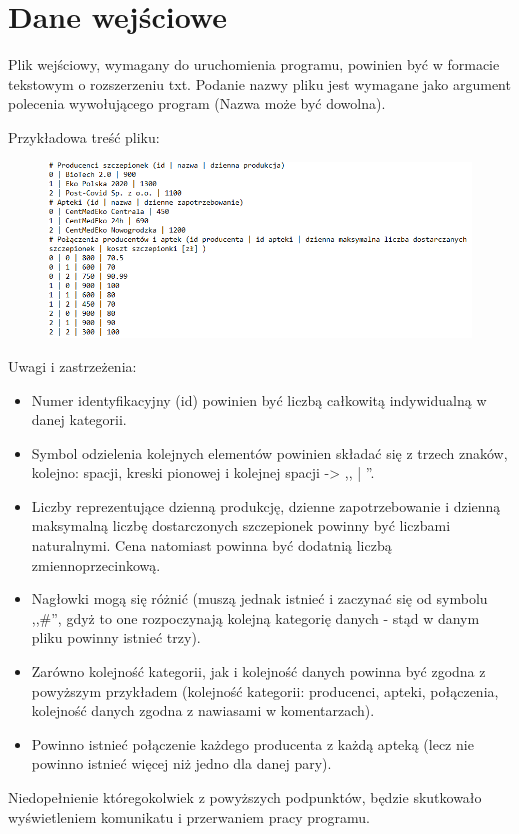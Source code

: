 \documentclass{article}
\begin{document}
\section{Dane wejściowe}
{\fontsize{12}{12}\selectfont
    Plik wejściowy, wymagany do uruchomienia programu, powinien być w formacie tekstowym o rozszerzeniu txt. Podanie nazwy pliku jest wymagane jako argument polecenia wywołującego program (Nazwa może być dowolna).

    
    Przykładowa treść pliku:
    
    \begin{figure} [hbt!]
        \centering
        \includegraphics[width=13.5cm]{input.png}
    \end{figure}
    
    Uwagi i zastrzeżenia:
    \begin{itemize}
     \item Numer identyfikacyjny (id) powinien być liczbą całkowitą indywidualną w danej kategorii.
     \item Symbol odzielenia kolejnych elementów powinien składać się z trzech znaków, kolejno: spacji, kreski pionowej i kolejnej spacji -> ,, | ''.
     \item Liczby reprezentujące dzienną produkcję, dzienne zapotrzebowanie i dzienną maksymalną liczbę dostarczonych szczepionek powinny być liczbami naturalnymi. Cena natomiast powinna być dodatnią liczbą zmiennoprzecinkową.
     \item Nagłowki mogą się różnić (muszą jednak istnieć i zaczynać się od symbolu ,,\#'', gdyż to one rozpoczynają kolejną kategorię danych - stąd w danym pliku powinny istnieć trzy).
     \item Zarówno kolejność kategorii, jak i kolejność danych powinna być zgodna z powyższym przykładem (kolejność kategorii: producenci, apteki, połączenia, kolejność danych zgodna z nawiasami w komentarzach).
     \item Powinno istnieć połączenie każdego producenta z każdą apteką (lecz nie powinno istnieć więcej niż jedno dla danej pary).
    
    \end{itemize}
    
    Niedopełnienie któregokolwiek z powyższych podpunktów, będzie skutkowało wyświetleniem komunikatu i przerwaniem pracy programu. 
}
\end{document}
